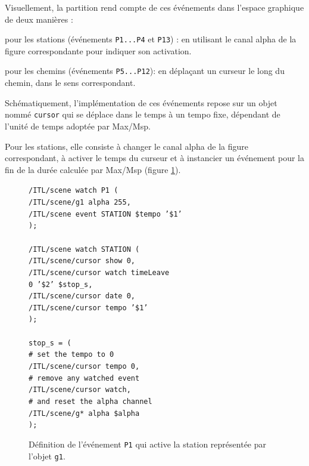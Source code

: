 \documentclass{article}
\newcommand{\OSC}[1]	{{\fontsize{9pt}{9pt} \selectfont\texttt{#1}}}
\newcommand{\tab}{\hspace*{4mm}}
\let\olditemize\itemize
\let\oldenditemize\enditemize
\renewenvironment{itemize} 	{\olditemize \renewcommand{\labelitemi}{$\bullet$} \setlength{\itemsep}{0mm}}{\oldenditemize}
\newcommand{\sample}[1]		{\vspace{-0.2em}\begin{center}\colorbox{mygrey}{\begin{minipage}[t]{0.98\columnwidth} {\small \texttt{#1}}\end{minipage}}\end{center}}
\begin{document}
\vspace{2mm}
Visuellement, la partition rend compte de ces événements dans l'espace graphique de deux manières :
\begin{itemize}
\item pour les stations (événements \OSC{P1...P4} et \OSC{P13}) : en utilisant le canal alpha de la figure correspondante pour indiquer son activation.
\item pour les chemins (événements \OSC{P5...P12}): en déplaçant un curseur le long du chemin, dans le sens correspondant.
\end{itemize}

Schématiquement, l'implémentation de ces événements repose sur un objet nommé \OSC{cursor} qui se déplace dans le temps à un tempo fixe, dépendant de l'unité de temps adoptée par Max/Msp. 

Pour les stations, elle consiste à changer le canal alpha de la figure correspondant, à activer le temps du curseur et à instancier un événement pour la fin de la durée calculée par Max/Msp (figure \ref{fig:station}). 
\begin{figure}[h]
   \centering
\sample{/ITL/scene watch P1 ( \\
\tab/ITL/scene/g1 alpha 255, \\
\tab/ITL/scene event STATION \$tempo '\$1' \\
); \\
\\
/ITL/scene watch STATION ( \\
\tab/ITL/scene/cursor show 0,\\
\tab/ITL/scene/cursor watch timeLeave \\
\hspace*{30mm}0 '\$2' \$stop\_s,\\
\tab/ITL/scene/cursor date 0,\\
\tab/ITL/scene/cursor tempo '\$1'\\
); \\
\\
stop\_s = ( \\
\tab\# set the tempo to 0 \\
\tab/ITL/scene/cursor tempo 0, \\
\tab\# remove any watched event \\
\tab/ITL/scene/cursor watch,  \\
\tab\# and reset the alpha channel \\
\tab/ITL/scene/g* alpha \$alpha \\
);
}
   \caption{Définition de l'événement \OSC{P1} qui active la station représentée par l'objet \OSC{g1}.}
   \label{fig:station}
\end{figure}
\end{document}

